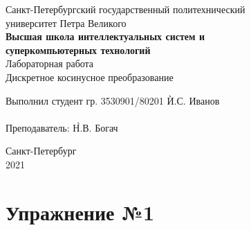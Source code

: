 \documentclass[a4paper, 14pt]{extarticle}
\begin{document}
    \begin{center}
        \begin{center}
            \hfill \break
            \normalsize{Санкт-Петербургский государственный политехнический}\\
            \normalsize{университет Петра Великого}\\
            \hfill \break
            \normalsize{\textbf{Высшая школа интеллектуальных систем и}}\\
            \normalsize{\textbf{суперкомпьютерных технологий}}\\
            \hfill \break
            \hfill \break
            \hfill \break
            \normalsize{Лабораторная работа}\\
            \hfill \break
            \normalsize{\LARGE Дискретное косинусное преобразование}\\
        \end{center}
        \hfill \break
        \hfill \break
        \hfill \break
        \hfill \break
        \hfill \break
        \hfill \break
        \hfill \break
        \hfill \break
        \hfill \break
        \hfill \break
        \begin{tabbing}
            Выполнил студент гр. 3530901/80201 \`И.С. Иванов\\
            \\
            Преподаватель: \`Н.В. Богач\\
        \end{tabbing}
        \hfill \break
        \hfill \break
        \hfill \break
        \hfill \break
        \begin{center}
            Санкт-Петербург\\
            2021
        \end{center}
        \thispagestyle{empty}
    \end{center}

    \newpage
    \tableofcontents

    \newpage
    \listoffigures

    \newpage
    \lstlistoflistings

    \newpage


    \section{Упражнение №1}
    \label{sec:1}
\end{document}
